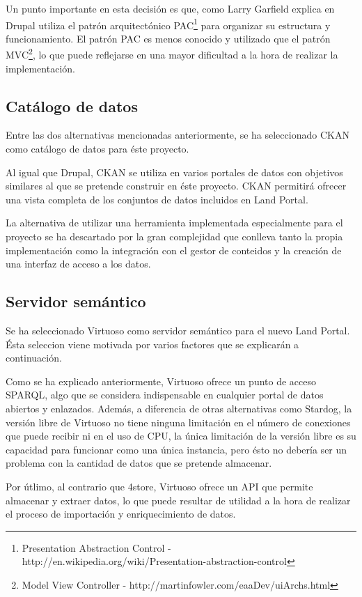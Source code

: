 Un punto importante en esta decisión es que, como Larry Garfield explica en \cite[]{pac-vs-mvc} Drupal utiliza el patrón arquitectónico PAC\footnote{Presentation Abstraction Control - http://en.wikipedia.org/wiki/Presentation-abstraction-control} para organizar su estructura y funcionamiento.  El patrón PAC es menos conocido y utilizado que el patrón MVC\footnote{Model View Controller - http://martinfowler.com/eaaDev/uiArchs.html}, lo que puede reflejarse en una mayor dificultad a la hora de realizar la implementación.


\subsection{Catálogo de datos}
Entre las dos alternativas mencionadas anteriormente, se ha seleccionado CKAN como catálogo de datos para éste proyecto.

Al igual que Drupal, CKAN se utiliza en varios portales de datos con objetivos similares al que se pretende construir en éste proyecto. CKAN permitirá ofrecer una vista completa de los conjuntos de datos incluidos en Land Portal.

La alternativa de utilizar una herramienta implementada especialmente para el proyecto se ha descartado por la gran complejidad que conlleva tanto la propia implementación como la integración con el gestor de conteidos y la creación de una interfaz de acceso a los datos.


\subsection{Servidor semántico}
Se ha seleccionado Virtuoso como servidor semántico para el nuevo Land Portal. Ésta seleccion viene motivada por varios factores que se explicarán a continuación.

Como se ha explicado anteriormente, Virtuoso ofrece un punto de acceso SPARQL, algo que se considera indispensable en cualquier portal de datos abiertos y enlazados.  Además, a diferencia de otras alternativas como Stardog, la versión libre de Virtuoso no tiene ninguna limitación en el número de conexiones que puede recibir ni en el uso de CPU, la única limitación de la versión libre es su capacidad para funcionar como una única instancia, pero ésto no debería ser un problema con la cantidad de datos que se pretende almacenar.

Por útlimo, al contrario que 4store, Virtuoso ofrece un API que permite almacenar y extraer datos, lo que puede resultar de utilidad a la hora de realizar el proceso de importación y enriquecimiento de datos.


